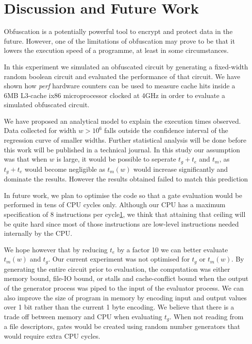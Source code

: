 \section{Discussion and Future Work}
Obfuscation is a potentially powerful tool to encrypt and protect data in the
future. However, one of the limitations of obfuscation may prove to be that it
lowers the execution speed of a programme, at least in some circumstances.
\par
In this experiment we simulated an obfuscated circuit by generating a fixed-width
random boolean circuit and evaluated the performance of that circuit. We have
shown how \textit{perf} hardware counters can be used to measure cache hits
inside a 6MB L3-cache ix86 microprocessor clocked at 4GHz in order to evaluate
a simulated obfuscated circuit.
\par
We have proposed an analytical model to explain the execution times observed. Data
collected for width $w > 10^6$ falls outside the confidence interval of the regression
curve of smaller widths. Further statistical analysis will be done before this work
will be published in a technical journal. In this study our assumption was that when $w$ is large, it would be
possible to seperate $t_g + t_e$ and $t_m$, as $t_g + t_e$ would become negligible as $t_m(w)$ would increase
significantly and dominate the results. However the results obtained failed to
match this prediction
\par
In future work, we plan to optimise the code so that a gate evaluation would be
performed in tens of CPU cycles only. Although our CPU has a maximum specification of 8 instructions per cycle\ref{}, we think
that attaining that ceiling will be quite hard since most of those instructions are
low-level instructions needed internally by the CPU.
\par
We hope however that by reducing $t_e$ by a factor 10 we can better evaluate
$t_m(w)$ and $t_g$. Our current experiment was not optimised for $t_g$ or $t_m(w)$.
By generating the entire circuit prior to evaluation, the computation was either memory bound,
file-IO bound, or stalls and cache-conflict bound when the output of the generator process
was piped to the input of the evaluator process. We can also improve the size of program in memory by encoding input and output values over
1 bit rather than the current 1 byte encoding.
We believe that there is a trade off between memory and CPU when evaluating $t_g$.
When not reading from a file descriptors, gates would be created using random number generators
that would require extra CPU cycles.
